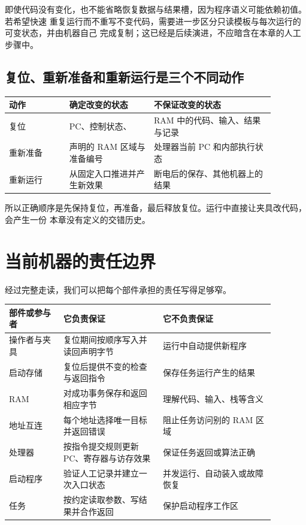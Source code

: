 即使代码没有变化，也不能省略恢复数据与结果槽，因为程序语义可能依赖初值。若希望快速
重复运行而不重写不变代码，需要进一步区分只读模板与每次运行的可变状态，并由机器自己
完成复制；这已经是后续演进，不应暗含在本章的人工步骤中。

\subsection{复位、重新准备和重新运行是三个不同动作}

\begin{longtable}{|L{0.20\linewidth}|L{0.28\linewidth}|L{0.40\linewidth}|}
\hline
{}
动作 & 确定改变的状态 & 不保证改变的状态 \\ \hline
复位 & PC、控制状态、 & RAM 中的代码、输入、结果与记录 \\ \hline
重新准备 & 声明的 RAM 区域与准备编号 & 处理器当前 PC 和内部执行状态 \\ \hline
重新运行 & 从固定入口推进并产生新效果 & 断电后的保存、其他机器上的结果 \\ \hline
\end{longtable}

所以正确顺序是先保持复位，再准备，最后释放复位。运行中直接让夹具改代码，会产生一份
本章没有定义的交错历史。

\section{当前机器的责任边界}

经过完整走读，我们可以把每个部件承担的责任写得足够窄。

\begin{longtable}{|L{0.18\linewidth}|L{0.33\linewidth}|L{0.37\linewidth}|}
\hline
{}
部件或参与者 & 它负责保证 & 它不负责保证 \\ \hline
操作者与夹具 & 复位期间按顺序写入并读回声明字节 & 运行中自动提供新程序 \\ \hline
启动存储 & 复位后提供不变的检查与返回指令 & 保存任务运行产生的结果 \\ \hline
RAM & 对成功事务保存和返回相应字节 & 理解代码、输入、栈等含义 \\ \hline
地址互连 & 每个地址选择唯一目标并返回错误 & 阻止任务访问别的 RAM 区域 \\ \hline
处理器 & 按指令提交规则更新 PC、寄存器与访存效果 & 保证任务返回或算法正确 \\ \hline
启动程序 & 验证人工记录并建立一次入口状态 & 并发运行、自动装入或故障恢复 \\ \hline
任务 & 按约定读取参数、写结果并合作返回 & 保护启动程序工作区 \\ \hline
\end{longtable}

